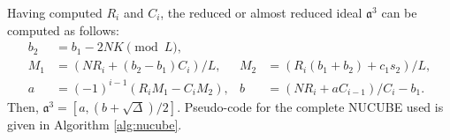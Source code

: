 \documentclass{ucalgthes1}
\theoremstyle{plain}
\theoremstyle{definition}
\begin{document}
\noindent
Having computed $R_i$ and $C_i$, the reduced or almost reduced ideal ${\mathfrak a}^3$ can be computed as follows:
\begin{align*}
	b_2 &= b_1 -2NK \pmod L, & \\
	M_1 &= (NR_i + (b_2-b_1)C_i)/L, &
	M_2 &= (R_i(b_1+b_2)+c_1s_2)/L, \\
	a &= (-1)^{i-1}(R_iM_1-C_iM_2), &
	b &= (NR_i + aC_{i-1})/C_i-b_1.
\end{align*}
Then, $\mathfrak a^3 = [a, (b+\sqrt\Delta)/2]$.  Pseudo-code for the complete NUCUBE used is given in Algorithm \ref{alg:nucube}.
\end{document}
